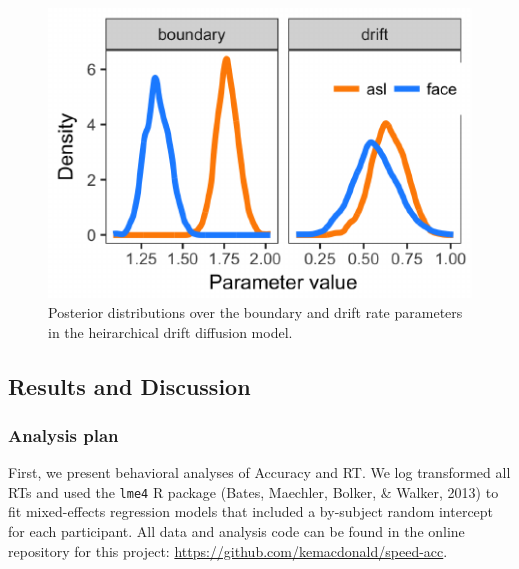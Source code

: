 \documentclass[10pt, letterpaper]{article}
\newenvironment{CodeChunk}{}{}
\begin{document}
\begin{CodeChunk}
\begin{figure}[t]

{\centering \includegraphics{figs/e1_hddm_plot-1} 

}

\caption[Posterior distributions over the boundary and drift rate parameters in the heirarchical drift diffusion model]{Posterior distributions over the boundary and drift rate parameters in the heirarchical drift diffusion model.}\label{fig:e1_hddm_plot}
\end{figure}
\end{CodeChunk}

\subsection{Results and Discussion}\label{results-and-discussion}

\subsubsection{Analysis plan}\label{analysis-plan}

First, we present behavioral analyses of Accuracy and RT. We log
transformed all RTs and used the \texttt{lme4} R package (Bates,
Maechler, Bolker, \& Walker, 2013) to fit mixed-effects regression
models that included a by-subject random intercept for each participant.
All data and analysis code can be found in the online repository for
this project: \url{https://github.com/kemacdonald/speed-acc}.
\end{document}
